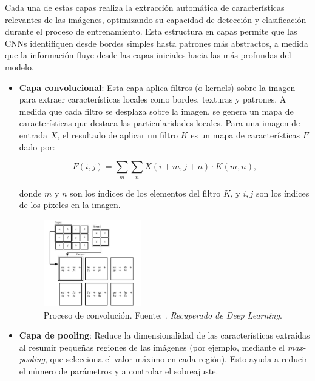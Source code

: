 Cada una de estas capas realiza la extracción automática de características relevantes de las imágenes, optimizando su capacidad de detección y clasificación durante el proceso de entrenamiento. Esta estructura en capas permite que las CNNs identifiquen desde bordes simples hasta patrones más abstractos, a medida que la información fluye desde las capas iniciales hacia las más profundas del modelo.

\begin{itemize} 
    \item 
    \textbf{Capa convolucional}: Esta capa aplica filtros (o kernels) sobre la imagen para extraer características locales como bordes, texturas y patrones. A medida que cada filtro se desplaza sobre la imagen, se genera un mapa de características que destaca las particularidades locales. Para una imagen de entrada \(X\), el resultado de aplicar un filtro \(K\) es un mapa de características \(F\) dado por:

    \[
    F(i,j) = \sum_m \sum_n X(i+m,j+n) \cdot K(m,n),
    \]

    donde \(m\) y \(n\) son los índices de los elementos del filtro \(K\), y \(i, j\) son los índices de los píxeles en la imagen.

    \begin{figure}[H]
        \centering
        \includegraphics[width=0.40\textwidth]{2/figures/Convolucion.png}
        \caption{Proceso de convolución. Fuente: \cite{Goodfellow-et-al-2016}. \textit{Recuperado de Deep Learning}.}
        \label{fig:convolucion}
    \end{figure}
    

    \item \textbf{Capa de pooling}: Reduce la dimensionalidad de las características extraídas al resumir pequeñas regiones de las imágenes (por ejemplo, mediante el \textit{max-pooling}, que selecciona el valor máximo en cada región). Esto ayuda a reducir el número de parámetros y a controlar el sobreajuste.
\end{itemize}

